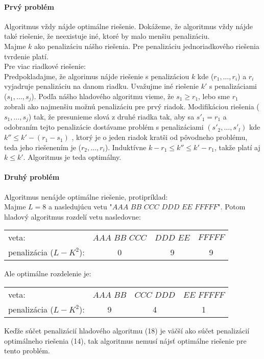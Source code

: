 \documentclass[12pt]{iv003}
\begin{document}
\paragraph{Prvý problém} Algoritmus vždy nájde optimálne riešenie. Dokážeme, že algoritmus vždy nájde také riešenie, že neexistuje iné, ktoré by malo menšiu penalizáciu.\\
Majme $k$ ako penalizáciu nášho riešenia. Pre penalizáciu jednoriadkového riešenia tvrdenie platí.\\
Pre viac riadkové riešenie:\\
Predpokladajme, že algorimus nájde riešenie s penalizáciou $k$ kde ($r_{1},\dots,r_{i}$) a $r_{i}$ vyjadruje penalizáciu na danom riadku.
Uvažujme iné riešenie $k'$ s penalizáciami ($s_{1},\dots,s_{j}$). Podľa nášho hladového algoritmu vieme, že $s_{1} \geq r_{1}$, lebo sme $r_{1}$ zobrali ako najmenšiu možnú penalizáciu pre prvý riadok. Modifikáciou riešenia ($s_{1},\dots,s_{j}$) tak, že presunieme slová z druhé riadka tak, aby sa $s'_{1} = r_{1}$ a odobraním tejto penalizácie dostávame problém s penalizáciami  $(s'_{2},\dots,s'_{l})$ kde $k'' \leq k' - (r_{1} - s_{1})$  , ktorý je o jeden riadok kratši od pôvodneho problému, teda jeho riešenením je ($r_{2},\dots,r_{i}$). Induktívne $k - r_{1}  \leq k'' \leq k' - r_{1}$, takže platí aj $k \leq k'$. Algoritmus je teda optimálny.

\paragraph{Druhý problém} Algoritmus nenájde optimálne riešenie, protipríklad:\\
Majme $L = 8$ a nasledujúcu vetu "$AAA$ $BB$ $CCC$ $DDD$ $EE$ $FFFFF$".
Potom hladový algoritmus rozdelí vetu nasledovne:
\begin{center}
\begin{tabular}{lc|c|c}
	veta: 			& $AAA$ $BB$ $CCC$ 	& $DDD$ $EE$ 	& $FFFFF$ \\
	penalizácia ($L - K^{2}$):	&	0				&	9			&	9	\\
\end{tabular}
\end{center}
Ale optimálne rozdelenie je:
\begin{center}
\begin{tabular}{lc|c|c}
	veta: 						& $AAA$ $BB$ 	& $CCC$ $DDD$ 	& $EE$ $FFFFF$ \\
	penalizácia ($L - K^{2}$):	&	9			&	4			&	1	\\
\end{tabular}
\end{center}
Keďže súčet penalizácií hladového algoritmu (18) je väčší ako súčet penalizácií optimálneho riešenia (14), tak algoritmus nemusí nájsť optimálne riešenie pre tento problém.
\end{document}
